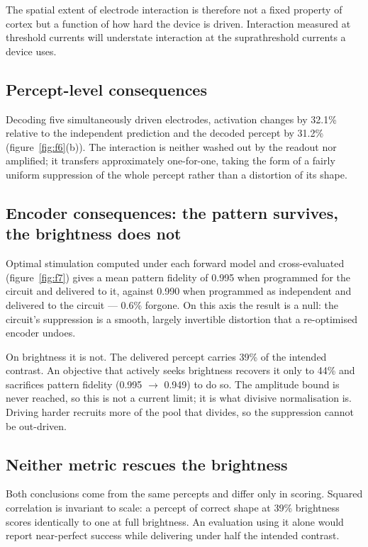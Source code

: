 \documentclass[10pt,twocolumn]{article}
\begin{document}
The spatial extent of electrode interaction is therefore not a fixed
property of cortex but a function of how hard the device is driven.
Interaction measured at threshold currents will understate interaction at
the suprathreshold currents a device uses.

\subsection{Percept-level consequences}

Decoding five simultaneously driven electrodes, activation changes by
32.1\% relative to the independent prediction and the decoded percept by
31.2\% (figure~\ref{fig:f6}(b)). The interaction is neither washed out by
the readout nor amplified; it transfers approximately one-for-one, taking
the form of a fairly uniform suppression of the whole percept rather than a
distortion of its shape.

\subsection{Encoder consequences: the pattern survives, the brightness does not}
\label{sec:s38}

Optimal stimulation computed under each forward model and cross-evaluated
(figure~\ref{fig:f7}) gives a mean pattern fidelity of 0.995 when programmed
for the circuit and delivered to it, against 0.990 when programmed as
independent and delivered to the circuit --- 0.6\% forgone. On this axis the
result is a null: the circuit's suppression is a smooth, largely invertible
distortion that a re-optimised encoder undoes.

On brightness it is not. The delivered percept carries 39\% of the intended
contrast. An objective that actively seeks brightness recovers it only to
44\% and sacrifices pattern fidelity (0.995 $\to$ 0.949) to do so. The
amplitude bound is never reached, so this is not a current limit; it is
what divisive normalisation is. Driving harder recruits more of the pool
that divides, so the suppression cannot be out-driven.

\subsection{Neither metric rescues the brightness}

Both conclusions come from the same percepts and differ only in scoring.
Squared correlation is invariant to scale: a percept of correct shape at
39\% brightness scores identically to one at full brightness. An evaluation
using it alone would report near-perfect success while delivering under
half the intended contrast.
\end{document}
